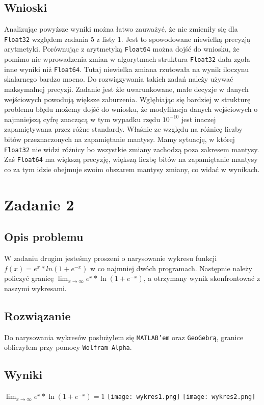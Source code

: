 \documentclass{article}
\begin{document}
\begin{center}
    \subsection{Wnioski}
    \large Analizując powyższe wyniki można łatwo zauważyć, że nie zmieniły się dla \texttt{Float32} względem zadania 5 z listy 1. Jest to spowodowane niewielką precyzją arytmetyki. 
     Porównując z arytmetyką \texttt{Float64} można dojść do wniosku, że pomimo nie wprowadzenia zmian w algorytmach struktura \texttt{Float32} dała zgoła inne wyniki niż \texttt{Float64}.
     Tutaj niewielka zmiana rzutowała na wynik iloczynu skalarnego bardzo mocno. 
     Do rozwiązywania takich zadań należy używać maksymalnej precyzji. 
     Zadanie jest źle uwarunkowane, małe decyzje w danych wejściowych powodują większe zaburzenia. 
     Wgłębiając się bardziej w strukturę problemu błędu możemy dojść do wniosku, że modyfikacja danych wejściowych o najmniejszą cyfrę znaczącą w tym wypadku rzędu \(10^{-10}\) jest inaczej zapamiętywana przez różne standardy.
     Właśnie ze względu na różnicę liczby bitów przeznaczonych na zapamiętanie mantysy. Mamy sytuację, w której \texttt{Float32} nie widzi różnicy bo wszystkie zmiany zachodzą poza zakresem mantysy.
     Zaś \texttt{Float64} ma większą precyzję, większą liczbę bitów na zapamiętanie mantysy co za tym idzie obejmuje swoim obszarem mantysy zmiany, co widać w wynikach.

    \section{Zadanie 2}
    \subsection{Opis problemu}
    \large W zadaniu drugim jesteśmy proszeni o narysowanie wykresu funkcji \(f(x) = e^x*ln(1 + e^{-x})\) w co najmniej dwóch programach.
     Następnie należy policzyć granicę \(\lim_{x \to \infty} e^x*\ln(1 + e^{-x})\), a otrzymany wynik skonfrontować z naszymi wykresami.
    \subsection{Rozwiązanie}
    \large Do narysowania wykresów posłużyłem się \texttt{MATLAB'em} oraz \texttt{GeoGebrą}, granice obliczyłem przy pomocy \texttt{Wolfram Alpha}.
    \subsection{Wyniki}
    \(\lim_{x \to \infty} e^x*\ln(1 + e^{-x}) = 1\)
    \texttt{[image: wykres1.png]}
    \texttt{[image: wykres2.png]}

\end{center}
\end{document}
